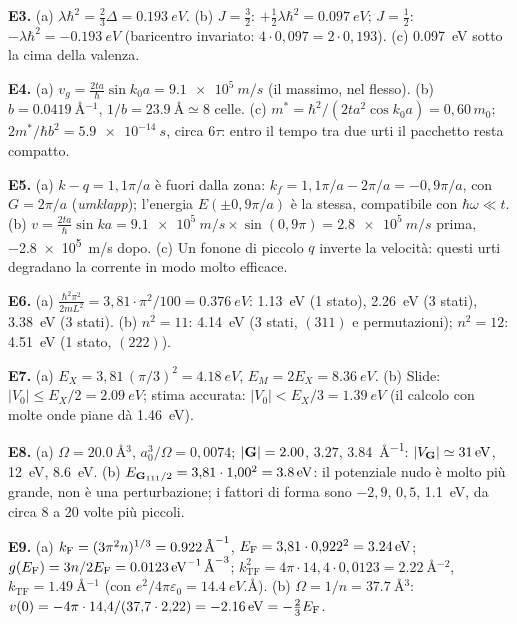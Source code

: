 \documentclass[11pt,a4paper]{article}
\begin{document}
\smallskip\noindent\textbf{E3.} (a) $\lambda\hbar^2=\frac23\Delta=\SI{0.193}{eV}$. (b) $J=\frac32$: $+\frac12\lambda\hbar^2=\SI{+0.097}{eV}$; $J=\frac12$:
$-\lambda\hbar^2=\SI{-0.193}{eV}$ (baricentro invariato: $4\cdot0{,}097=2\cdot0{,}193$). (c) \SI{0.097}{eV} sotto la cima della valenza.

\smallskip\noindent\textbf{E4.} (a) $v_g=\frac{2ta}\hbar\sin k_0a=\SI{9.1e5}{m/s}$ (il massimo, nel flesso). (b) $b=\SI{0.0419}{\angstrom^{-1}}$,
$1/b=\SI{23.9}{\angstrom}\simeq8$ celle. (c) $m^*=\hbar^2/(2ta^2\cos k_0a)=0{,}60\,m_0$; $2m^*/\hbar b^2=\SI{5.9e-14}{s}$, circa $6\tau$: entro il tempo
tra due urti il pacchetto resta compatto.

\smallskip\noindent\textbf{E5.} (a) $k-q=1{,}1\pi/a$ è fuori dalla zona: $k_f=1{,}1\pi/a-2\pi/a=-0{,}9\pi/a$, con $G=2\pi/a$ (\emph{umklapp}); l'energia
$E(\pm0{,}9\pi/a)$ è la stessa, compatibile con $\hbar\omega\ll t$. (b) $v=\frac{2ta}\hbar\sin ka=\SI{9.1e5}{m/s}\times\sin(0{,}9\pi)=\SI{+2.8e5}{m/s}$
prima, \SI{-2.8e5}{m/s} dopo. (c) Un fonone di piccolo $q$ inverte la velocità: questi urti degradano la corrente in modo molto efficace.

\smallskip\noindent\textbf{E6.} (a) $\frac{\hbar^2\pi^2}{2mL^2}=3{,}81\cdot\pi^2/100=\SI{0.376}{eV}$: \SI{1.13}{eV} (1 stato), \SI{2.26}{eV} (3 stati),
\SI{3.38}{eV} (3 stati). (b) $n^2=11$: \SI{4.14}{eV} (3 stati, $(311)$ e permutazioni); $n^2=12$: \SI{4.51}{eV} (1 stato, $(222)$).

\smallskip\noindent\textbf{E7.} (a) $E_X=3{,}81\,(\pi/3)^2=\SI{4.18}{eV}$, $E_M=2E_X=\SI{8.36}{eV}$. (b) Slide: $|V_0|\le E_X/2=\SI{2.09}{eV}$; stima
accurata: $|V_0|<E_X/3=\SI{1.39}{eV}$ (il calcolo con molte onde piane dà \SI{1.46}{eV}).

\smallskip\noindent\textbf{E8.} (a) $\Omega=\SI{20.0}{\angstrom^3}$, $a_0^3/\Omega=0{,}0074$; $|\mathbf G|=\num{2.00}$, $\num{3.27}$, \SI{3.84}{\angstrom^{-1}}:
$|V_{\mathbf G}|\simeq\SI{31}{eV}$, \SI{12}{eV}, \SI{8.6}{eV}. (b) $E_{\mathbf G_{111}/2}=3{,}81\cdot1{,}00^2=\SI{3.8}{eV}$: il potenziale nudo è molto più grande, non
è una perturbazione; i fattori di forma sono $-2{,}9$, $0{,}5$, \SI{1.1}{eV}, da circa 8 a 20 volte più piccoli.

\smallskip\noindent\textbf{E9.} (a) $k_{\mathrm F}=(3\pi^2n)^{1/3}=\SI{0.922}{\angstrom^{-1}}$, $E_{\mathrm F}=3{,}81\cdot0{,}922^2=\SI{3.24}{eV}$;
$g(E_{\mathrm F})=3n/2E_{\mathrm F}=\SI{0.0123}{eV^{-1}.\angstrom^{-3}}$; $k_{\mathrm{TF}}^2=4\pi\cdot14{,}4\cdot0{,}0123=\SI{2.22}{\angstrom^{-2}}$,
$k_{\mathrm{TF}}=\SI{1.49}{\angstrom^{-1}}$ (con $e^2/4\pi\varepsilon_0=\SI{14.4}{eV.\angstrom}$). (b) $\Omega=1/n=\SI{37.7}{\angstrom^3}$:
$v(0)=-4\pi\cdot14{,}4/(37{,}7\cdot2{,}22)=\SI{-2.16}{eV}=-\frac23E_{\mathrm F}$.
\end{document}
